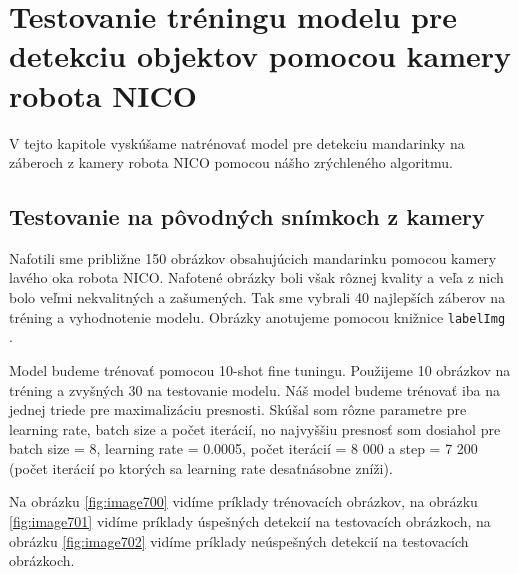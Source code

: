 \chapter{Testovanie tréningu modelu pre detekciu objektov pomocou kamery robota NICO}\label{chap:results}

V tejto kapitole vyskúšame natrénovať model pre detekciu mandarinky na záberoch z kamery robota NICO pomocou nášho zrýchleného algoritmu.

\section{Testovanie na pôvodných snímkoch z kamery}

Nafotili sme približne 150 obrázkov obsahujúcich mandarinku pomocou kamery lavého oka robota NICO. Nafotené obrázky boli však rôznej kvality a veľa z nich bolo veľmi nekvalitných a zašumených. Tak sme vybrali 40 najlepších záberov na tréning a vyhodnotenie modelu. Obrázky anotujeme pomocou knižnice \texttt{labelImg} \cite{labelImg}.

Model budeme trénovať pomocou 10-shot fine tuningu. Použijeme 10 obrázkov na tréning a zvyšných 30 na testovanie modelu. Náš model budeme trénovať iba na jednej triede pre maximalizáciu presnosti. Skúšal som rôzne parametre pre learning rate, batch size a počet iterácií, no najvyššiu presnosť som dosiahol pre batch size = 8, learning rate = 0.0005, počet iterácií = 8 000 a step = 7 200 (počet iterácií po ktorých sa learning rate desaťnásobne zníži). 

Na obrázku \ref{fig:image700} vidíme príklady trénovacích obrázkov, na obrázku \ref{fig:image701} vidíme príklady úspešných detekcií na testovacích obrázkoch, na obrázku \ref{fig:image702} vidíme príklady neúspešných detekcií na testovacích obrázkoch.

